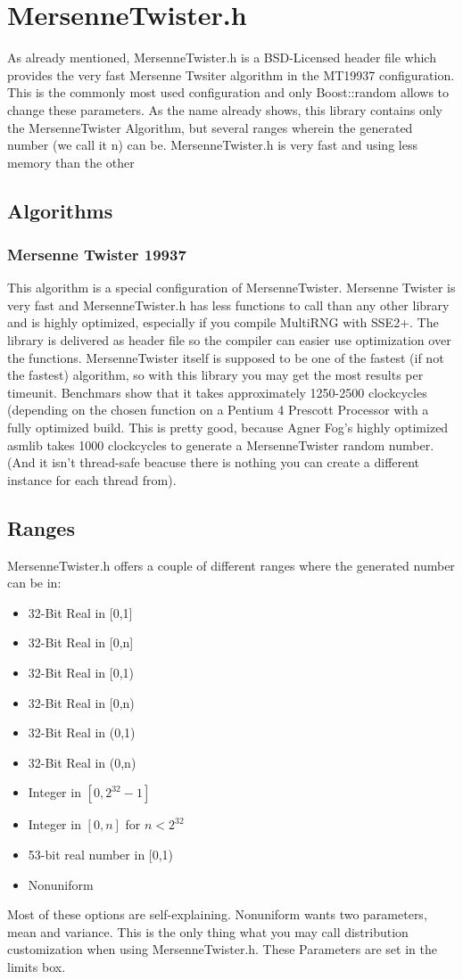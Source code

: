\documentclass{scrartcl}
\begin{document}
\section{MersenneTwister.h}
As already mentioned, MersenneTwister.h is a BSD-Licensed header file which provides the very fast Mersenne Twsiter algorithm in the MT19937 configuration. This is the commonly most used configuration and only Boost::random allows to change these parameters. As the name already shows, this library contains only the MersenneTwister Algorithm, but several ranges wherein the generated number (we call it n) can be. MersenneTwister.h is very fast and using less memory than the other
\subsection{Algorithms}
\subsubsection{Mersenne Twister 19937}
This algorithm is a special configuration of MersenneTwister. Mersenne Twister is very fast and MersenneTwister.h has less functions to call than any other library and is highly optimized, especially if you compile MultiRNG with SSE2+. The library is delivered as header file so the compiler can easier use optimization over the functions. MersenneTwister itself is supposed to be one of the fastest (if not the fastest) algorithm, so with this library you may get the most results per timeunit. Benchmars show that it takes approximately 1250-2500 clockcycles (depending on the chosen function on a Pentium 4 Prescott Processor with a fully optimized build. This is pretty good, because Agner Fog's highly optimized asmlib takes 1000 clockcycles to generate a MersenneTwister random number. (And it isn't thread-safe beacuse there is nothing you can create a different instance for each thread from).
\subsection{Ranges}
MersenneTwister.h offers a couple of different ranges where the generated number can be in:
\begin{itemize}
	\item 32-Bit Real in [0,1]
	\item 32-Bit Real in [0,n]
	\item 32-Bit Real in [0,1)
	\item 32-Bit Real in [0,n)
	\item 32-Bit Real in (0,1)
	\item 32-Bit Real in (0,n)
	\item Integer in $[0,2^32-1]$
	\item Integer in $[0,n]$ for $n<2^{32}$
	\item 53-bit real number in [0,1)
	\item Nonuniform
\end{itemize}
Most of these options are self-explaining. Nonuniform wants two parameters, mean and variance. This is the only thing what you may call distribution customization when using MersenneTwister.h. These Parameters are set in the limits box.
\end{document}
